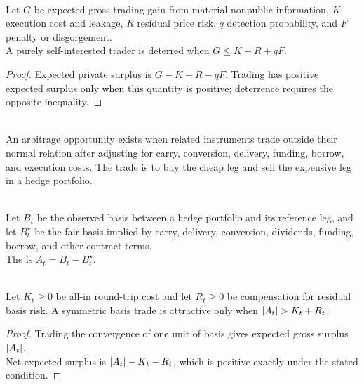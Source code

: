 \begin{proposition} \\
Let $G$ be expected gross trading gain from material nonpublic information, $K$ execution cost and leakage, $R$ residual price risk, $q$ detection probability, and $F$ penalty or disgorgement.\\
A purely self-interested trader is deterred when $G\le K+R+qF$.
\begin{proof}
Expected private surplus is $G-K-R-qF$. Trading has positive expected surplus only when this quantity is positive; deterrence requires the opposite inequality.
\end{proof}
\end{proposition}

\begin{definition} \\
An arbitrage opportunity exists when related instruments trade outside their normal relation after adjusting for carry, conversion, delivery, funding, borrow, and execution costs. The trade is to buy the cheap leg and sell the expensive leg in a hedge portfolio.
\end{definition}

\begin{notation} \\
Let $B_t$ be the observed basis between a hedge portfolio and its reference leg, and let $B_t^\star$ be the fair basis implied by carry, delivery, conversion, dividends, funding, borrow, and other contract terms.\\
The  is $A_t=B_t-B_t^\star$.
\end{notation}

\begin{proposition} \\
Let $K_t\ge0$ be all-in round-trip cost and let $R_t\ge0$ be compensation for residual basis risk. A symmetric basis trade is attractive only when $\left\lvert A_t\right\rvert>K_t+R_t$.
\begin{proof}
Trading the convergence of one unit of basis gives expected gross surplus $\left\lvert A_t\right\rvert$.\\
Net expected surplus is $\left\lvert A_t\right\rvert-K_t-R_t$, which is positive exactly under the stated condition.
\end{proof}
\end{proposition}

